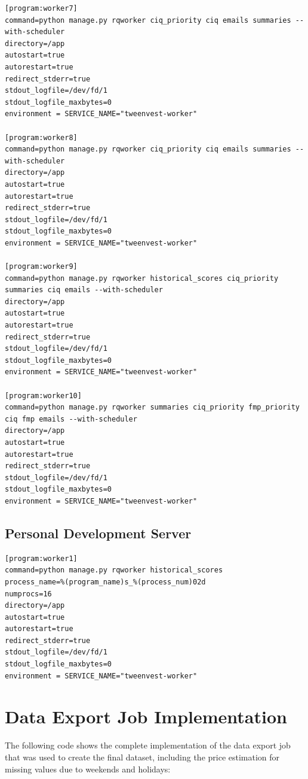 \documentclass[11pt,english,a4paper,hidelinks]{book}
\begin{document}
\begin{lstlisting}[language={}, caption=Production Workers Management, label={lst:tweenvest_production_workers_management}]
[program:worker7]
command=python manage.py rqworker ciq_priority ciq emails summaries --with-scheduler
directory=/app
autostart=true
autorestart=true
redirect_stderr=true
stdout_logfile=/dev/fd/1
stdout_logfile_maxbytes=0
environment = SERVICE_NAME="tweenvest-worker"

[program:worker8]
command=python manage.py rqworker ciq_priority ciq emails summaries --with-scheduler
directory=/app
autostart=true
autorestart=true
redirect_stderr=true
stdout_logfile=/dev/fd/1
stdout_logfile_maxbytes=0
environment = SERVICE_NAME="tweenvest-worker"

[program:worker9]
command=python manage.py rqworker historical_scores ciq_priority summaries ciq emails --with-scheduler
directory=/app
autostart=true
autorestart=true
redirect_stderr=true
stdout_logfile=/dev/fd/1
stdout_logfile_maxbytes=0
environment = SERVICE_NAME="tweenvest-worker"

[program:worker10]
command=python manage.py rqworker summaries ciq_priority fmp_priority ciq fmp emails --with-scheduler
directory=/app
autostart=true
autorestart=true
redirect_stderr=true
stdout_logfile=/dev/fd/1
stdout_logfile_maxbytes=0
environment = SERVICE_NAME="tweenvest-worker"
\end{lstlisting}

\subsection{Personal Development Server}
\begin{lstlisting}[language={}, caption=Hetzner Workers Management, label={lst:hetzner_workers_management}]
[program:worker1]
command=python manage.py rqworker historical_scores
process_name=%(program_name)s_%(process_num)02d
numprocs=16
directory=/app
autostart=true
autorestart=true
redirect_stderr=true
stdout_logfile=/dev/fd/1
stdout_logfile_maxbytes=0
environment = SERVICE_NAME="tweenvest-worker"
\end{lstlisting}


\section{Data Export Job Implementation}
\label{app:data_export_job}

\noindent The following code shows the complete implementation of the data export job that was used to create the final dataset, including the price estimation for missing values due to weekends and holidays:
\end{document}
